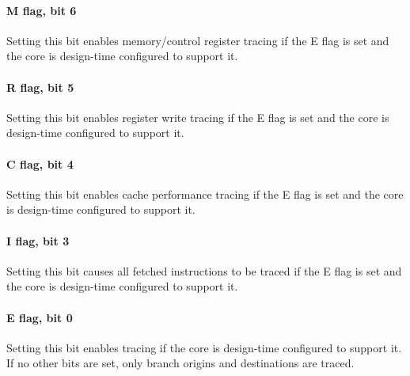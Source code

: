 \paragraph*{M flag, bit 6}
Setting this bit enables memory/control register tracing if the E flag is set
and the core is design-time configured to support it.
\paragraph*{R flag, bit 5}
Setting this bit enables register write tracing if the E flag is set and the
core is design-time configured to support it.
\paragraph*{C flag, bit 4}
Setting this bit enables cache performance tracing if the E flag is set and the
core is design-time configured to support it.
\paragraph*{I flag, bit 3}
Setting this bit causes all fetched instructions to be traced if the E flag is
set and the core is design-time configured to support it.
\paragraph*{E flag, bit 0}
Setting this bit enables tracing if the core is design-time configured to
support it. If no other bits are set, only branch origins and destinations are
traced.

